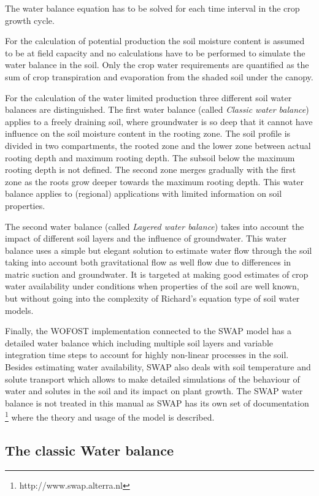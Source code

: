 The water balance equation has to be solved for each time interval in the crop growth cycle.

For the calculation of potential production the soil moisture content is
assumed to be at field capacity and no calculations have to be performed to simulate the
water balance in the soil. Only the crop water requirements are quantified as the sum of 
crop transpiration and evaporation from the shaded soil under the canopy. 

For the calculation of the water limited production three different soil water balances are
distinguished. The first water balance (called \emph{Classic water balance}) applies to a freely draining soil, where groundwater is so deep that it cannot have influence on the soil moisture content in the rooting zone. The soil profile is divided in two compartments, the rooted zone and the lower zone between actual rooting depth and maximum rooting depth. The subsoil below the maximum rooting depth is not defined. The second zone merges gradually with the first zone as the roots grow deeper towards the maximum rooting depth. This water balance applies to (regional) applications with limited information on soil properties.

The second water balance (called \emph{Layered water balance}) takes into account the impact of different soil layers and the influence of groundwater. This water balance uses a simple but elegant solution to estimate water flow through the soil taking into account both gravitational flow as well flow due to differences in matric suction and groundwater. It is targeted at making good estimates of crop water availability under conditions when properties of the soil are well known, but without going into the complexity of Richard's equation type of soil water models. 

Finally, the WOFOST implementation connected to the SWAP model has a detailed water balance which including multiple soil layers and variable integration time steps to account for highly non-linear processes in the soil. Besides estimating water availability, SWAP also deals with soil temperature and solute transport which allows to make 
detailed simulations of the behaviour of water and solutes in the soil and its impact on plant growth.
The SWAP water balance is not treated in this manual as SWAP has its own set of documentation 
\footnote{http://www.swap.alterra.nl} where the theory and usage of the model is described.

\subsection{The classic Water balance}
\label{sec:WATFD}

